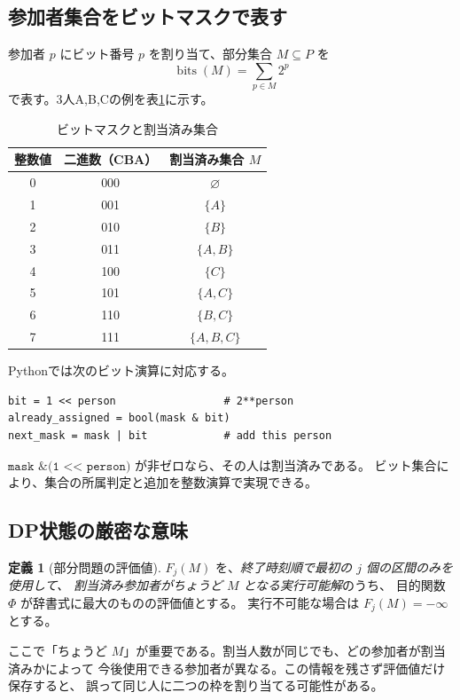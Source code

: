 \documentclass[11pt,a4paper]{ltjsarticle}
\theoremstyle{definition}
\newtheorem{definition}[theorem]{定義}
\theoremstyle{remark}
\newcommand{\bits}{\operatorname{bits}}
\newcommand{\code}[1]{\texttt{#1}}
\newcommand{\negInf}{\bm{-\infty}}
\begin{document}
\subsection{参加者集合をビットマスクで表す}
参加者 $p$ にビット番号 $p$ を割り当て、部分集合 $M\subseteq P$ を
\begin{equation}
 \bits(M)=\sum_{p\in M}2^p
 \label{eq:mask}
\end{equation}
で表す。3人A,B,Cの例を表\ref{tab:masks}に示す。
\begin{table}[htbp]
\centering
\caption{ビットマスクと割当済み集合}
\label{tab:masks}
\begin{tabular}{ccc}
\toprule
整数値 & 二進数（CBA） & 割当済み集合 $M$ \\
\midrule
0 & 000 & $\varnothing$ \\
1 & 001 & $\{A\}$ \\
2 & 010 & $\{B\}$ \\
3 & 011 & $\{A,B\}$ \\
4 & 100 & $\{C\}$ \\
5 & 101 & $\{A,C\}$ \\
6 & 110 & $\{B,C\}$ \\
7 & 111 & $\{A,B,C\}$ \\
\bottomrule
\end{tabular}
\end{table}

Pythonでは次のビット演算に対応する。
\begin{Verbatim}[fontsize=\small,frame=single]
bit = 1 << person                 # 2**person
already_assigned = bool(mask & bit)
next_mask = mask | bit            # add this person
\end{Verbatim}

$\code{mask \& (1 << person)}$ が非ゼロなら、その人は割当済みである。
ビット集合により、集合の所属判定と追加を整数演算で実現できる。

\subsection{DP状態の厳密な意味}
\begin{definition}[部分問題の評価値]
$F_j(M)$ を、\emph{終了時刻順で最初の $j$ 個の区間のみを使用して、
割当済み参加者がちょうど $M$ となる実行可能解}のうち、
目的関数 $\Phi$ が辞書式に最大のものの評価値とする。
実行不可能な場合は $F_j(M)=\negInf$ とする。
\end{definition}

ここで「ちょうど $M$」が重要である。割当人数が同じでも、どの参加者が割当済みかによって
今後使用できる参加者が異なる。この情報を残さず評価値だけ保存すると、
誤って同じ人に二つの枠を割り当てる可能性がある。
\end{document}
